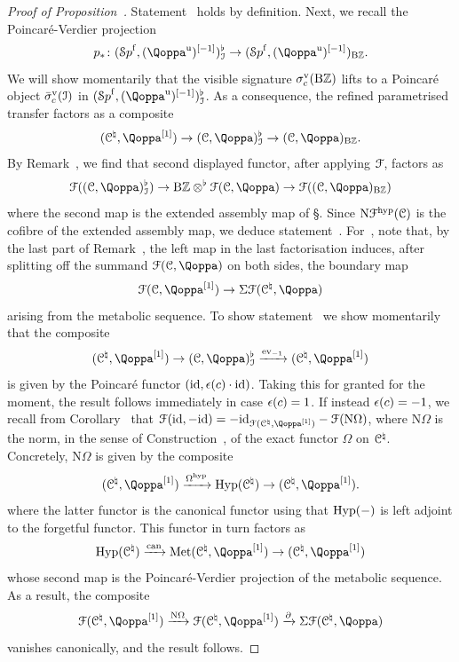\begin{proof}[Proof of Proposition~]
Statement~ holds by definition. Next, we recall 
the Poincaré-Verdier projection
\[
p_*\colon (\Spaf,(\QF^{\uni})\qshift{-1})_{\I}^\flat \to (\Spaf,(\QF^{\uni})\qshift{-1})_{\B\ZZ}.
\]
We will show momentarily that the visible signature $\sigma^{\mathrm{v}}_c(\mathrm{B}\mathbb{Z})$ lifts 
to a Poincar\'e object $\bar{\sigma}^{\mathrm{v}}_c(\mathcal{I})$ in $(\Spaf,(\QF^{\uni})\qshift{-1})_{\I}^\flat$. As a consequence, the refined parametrised transfer factors as a composite
\[
(\C^\natural,\QF\qshift{1}) \to (\C,\QF)^\flat_\I \to (\C,\QF)_{\B\ZZ}.
\]
By Remark~, we find that second displayed functor, after applying $\mathcal{F}$, factors as
\[
\F((\C,\QF)^\flat_\I) \to \B\ZZ\otimes^{\flat}\F(\C,\QF) \to \F((\C,\QF)_{\B\ZZ})
\]
where the second map is the extended assembly map of \S{}.
Since $\mathrm{N}\mathcal{F}^{\mathrm{hyp}}(\mathcal C)$ is the cofibre of the extended assembly map, we deduce statement~. 
For~, note that, by the last part of Remark~, the left map in the last factorisation induces, after splitting off the summand $\F(\C,\QF)$ on both sides, the boundary map
\[
\F(\C,\QF\qshift{1}) \to \Sig\F(\C^{\natural},\QF)
\]
arising from the metabolic sequence.
To show statement~ we show momentarily that the composite
\[
(\C^\natural,\QF\qshift{1}) \to (\C,\QF)_\I^\flat \xrightarrow{\ev_{-1}} (\C^\natural,\QF\qshift{1})
\]
is given by the Poincar\'e functor $(\mathrm{id},\epsilon(c)\cdot \mathrm{id})$. Taking this for granted for the moment, the result follows immediately in case $\epsilon(c) =1$. If instead $\epsilon(c) = -1$, we recall from Corollary~ that $\F(\id,-\id) = -\id_{\F(\C^\natural,\QF\qshift{1})} - \F(\mathrm{N}\Omega)$, where $\mathrm{N}\Omega$ is the norm, in the sense of Construction~, of the exact functor $\Omega$ on $\mathcal C^\natural$. Concretely, $\mathrm{N}\Omega$ is given by the composite
\[
(\C^\natural,\QF\qshift{1}) \xrightarrow{\Omega^\hyp} \Hyp(\C^\natural) \to (\C^\natural,\QF\qshift{1}).
\]
where the latter functor is the canonical functor using that $\operatorname{Hyp}(-)$ is left adjoint to the forgetful functor. This functor in turn factors as 
\[
\Hyp(\C^\natural) \xrightarrow{\mathrm{can}} \Met(\C^\natural,\QF\qshift{1}) \to (\C^\natural,\QF\qshift{1})
\]
whose second map is the Poincar\'e-Verdier projection of the metabolic sequence.
As a result, the composite 
\[
\F(\C^\natural,\QF\qshift{1}) \xrightarrow{\mathrm{N}\Omega} \F(\C^\natural,\QF\qshift{1}) \xrightarrow{\partial} \Sigma \F(\C^\natural,\QF)
\]
vanishes canonically, and the result follows.


\end{proof}
